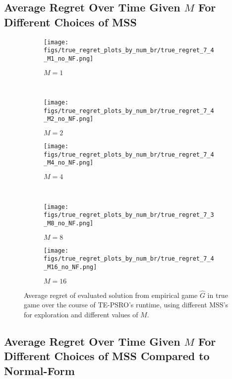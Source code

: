 \subsection{Average Regret Over Time Given $M$ For Different Choices of MSS}

\begin{figure}[H]
    \centering
    \begin{subfigure}[b]{0.48\textwidth}
    \texttt{[image: figs/true\_regret\_plots\_by\_num\_br/true\_regret\_7\_4\_M1\_no\_NF.png]}
    \caption{$M = 1$}
    \label{fig:app_regret_M1_no_NF}
    \end{subfigure}~
    \begin{subfigure}[b]{0.48\textwidth}
    \texttt{[image: figs/true\_regret\_plots\_by\_num\_br/true\_regret\_7\_4\_M2\_no\_NF.png]}
    \caption{$M = 2$}
    \label{fig:app_regret_M2_no_NF}
    \end{subfigure}
    \begin{subfigure}[b]{0.48\textwidth}
    \texttt{[image: figs/true\_regret\_plots\_by\_num\_br/true\_regret\_7\_4\_M4\_no\_NF.png]}
    \caption{$M = 4$}
    \label{fig:app_regret_M4_no_NF}
    \end{subfigure}~
    \begin{subfigure}[b]{0.48\textwidth}
    \texttt{[image: figs/true\_regret\_plots\_by\_num\_br/true\_regret\_7\_3\_M8\_no\_NF.png]}
    \caption{$M = 8$}
    \label{fig:app_regret_M8_no_NF}
    \end{subfigure}
    \begin{subfigure}[b]{0.48\textwidth}
    \texttt{[image: figs/true\_regret\_plots\_by\_num\_br/true\_regret\_7\_4\_M16\_no\_NF.png]}
    \caption{$M = 16$}
    \label{fig:app_regret_M16_no_NF}
    \end{subfigure}
    \caption{Average regret of evaluated solution from empirical game $\hat{G}$ in true game over the course of TE-PSRO's runtime, using different MSS's for exploration and different values of $M$.}
    \label{fig:app_true_regret_no_NF_by_M}
\end{figure}
\newpage

\subsection{Average Regret Over Time Given $M$ For Different Choices of MSS Compared to Normal-Form}


